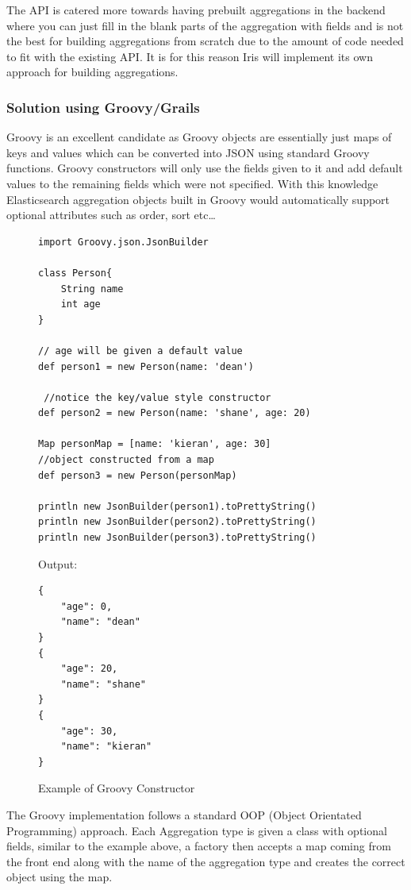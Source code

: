 \documentclass[12pt,a4paper,titlepage]{report}
\begin{document}
The API is catered more towards having prebuilt aggregations in the backend where you can just fill in the blank parts of the aggregation with fields and is not the best for building aggregations from scratch due to the amount of code needed to fit with the existing API. It is for this reason Iris will implement its own approach for building aggregations.

\subsubsection{Solution using Groovy/Grails}
Groovy is an excellent candidate as Groovy objects are essentially just maps of keys and values which can be converted into JSON using standard Groovy functions. Groovy constructors will only use the fields given to it and add default values to the remaining fields which were not specified. With this knowledge Elasticsearch aggregation objects built in Groovy would automatically support optional attributes such as order, sort etc… 
\begin{figure}[H]
\begin{tcolorbox}
\begin{verbatim}
import Groovy.json.JsonBuilder 

class Person{     
    String name 
    int age
}  

// age will be given a default value
def person1 = new Person(name: 'dean') 

 //notice the key/value style constructor
def person2 = new Person(name: 'shane', age: 20) 

Map personMap = [name: 'kieran', age: 30]
//object constructed from a map
def person3 = new Person(personMap)

println new JsonBuilder(person1).toPrettyString()
println new JsonBuilder(person2).toPrettyString()
println new JsonBuilder(person3).toPrettyString()​
\end{verbatim}
Output:
\begin{verbatim}
{
    "age": 0,
    "name": "dean"
}
{
    "age": 20,
    "name": "shane"
}
{
    "age": 30,
    "name": "kieran"
}
\end{verbatim}
\end{tcolorbox}
\caption{Example of Groovy Constructor}
\end{figure}
\pagebreak
The Groovy implementation follows a standard OOP (Object Orientated Programming) approach. Each Aggregation type is given a class with optional fields, similar to the example above, a factory then accepts a map coming from the front end along with the name of the aggregation type and creates the correct object using the map.
\end{document}
